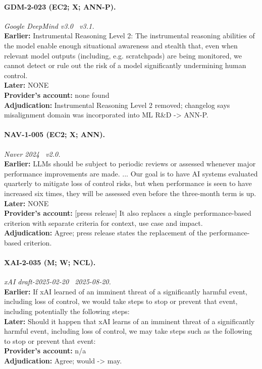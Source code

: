 \paragraph{GDM-2-023 (EC2; X; ANN-P).} \emph{Google DeepMind v3.0 \textrightarrow\ v3.1.}\\
\textbf{Earlier:} Instrumental Reasoning Level 2: The instrumental reasoning abilities of the model enable enough situational awareness and stealth that, even when relevant model outputs (including, e.g. scratchpads) are being monitored, we cannot detect or rule out the risk of a model significantly undermining human control.\\
\textbf{Later:} NONE\\
\textbf{Provider's account:} none found\\
\textbf{Adjudication:} Instrumental Reasoning Level 2 removed; changelog says misalignment domain was incorporated into ML R\&D -> ANN-P.

\paragraph{NAV-1-005 (EC2; X; ANN).} \emph{Naver 2024 \textrightarrow\ v2.0.}\\
\textbf{Earlier:} LLMs should be subject to periodic reviews or assessed whenever major performance improvements are made. ... Our goal is to have AI systems evaluated quarterly to mitigate loss of control risks, but when performance is seen to have increased six times, they will be assessed even before the three-month term is up.\\
\textbf{Later:} NONE\\
\textbf{Provider's account:} [press release] It also replaces a single performance-based criterion with separate criteria for context, use case and impact.\\
\textbf{Adjudication:} Agree; press release states the replacement of the performance-based criterion.

\paragraph{XAI-2-035 (M; W; NCL).} \emph{xAI draft-2025-02-20 \textrightarrow\ 2025-08-20.}\\
\textbf{Earlier:} If xAI learned of an imminent threat of a significantly harmful event, including loss of control, we would take steps to stop or prevent that event, including potentially the following steps:\\
\textbf{Later:} Should it happen that xAI learns of an imminent threat of a significantly harmful event, including loss of control, we may take steps such as the following to stop or prevent that event:\\
\textbf{Provider's account:} n/a\\
\textbf{Adjudication:} Agree; would -> may.

